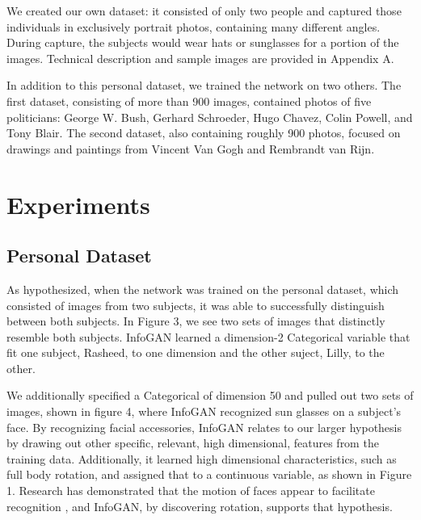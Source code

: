 \documentclass[conference,11pt]{IEEEtran}
\begin{document}
We created our own dataset: it consisted of only two people and captured those individuals in exclusively portrait photos, containing many different angles. During capture, the subjects would wear hats or sunglasses for a portion of the images. Technical description and sample images are provided in Appendix A.

In addition to this personal dataset, we trained the network on two others.  The first dataset, consisting of more than 900 images, contained photos of five politicians: George W. Bush, Gerhard Schroeder, Hugo Chavez, Colin Powell, and Tony Blair.  The second dataset, also containing roughly 900 photos, focused on drawings and paintings from Vincent Van Gogh and Rembrandt van Rijn.



\section{Experiments}

\subsection{Personal Dataset}

As hypothesized, when the network was trained on the personal dataset, which consisted of images from two subjects, it was able to successfully distinguish between both subjects.  In Figure 3, we see two sets of images that distinctly resemble both subjects.  InfoGAN learned a dimension-2 Categorical variable that fit one subject, Rasheed, to one dimension and the other suject, Lilly, to the other.

We additionally specified a Categorical of dimension 50 and pulled out two sets of images, shown in figure 4, where InfoGAN recognized sun glasses on a subject's face.  By recognizing facial accessories, InfoGAN relates to our larger hypothesis by drawing out other specific, relevant, high dimensional, features from the training data.  Additionally, it learned high dimensional characteristics, such as full body rotation, and assigned that to a continuous variable, as shown in Figure 1. Research has demonstrated that the motion of faces appear to facilitate recognition \cite{faceRecog}, and InfoGAN, by discovering rotation, supports that hypothesis.
\end{document}
